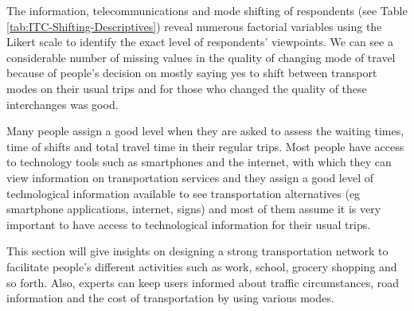\documentclass[
11pt, %
oneside, %
english, %
singlespacing, %
]{macthesis} %
\newcommand{\blandscape}{\begin{landscape}}
\newcommand{\elandscape}{\end{landscape}}
\begin{document}
\newpage
\blandscape
\begin{table}

\caption{\label{tab:unnamed-chunk-11}\label{tab:Social-Interaction-Descriptives}Variables regarding social interactions of respondents}
\centering
{}
\end{table}
\elandscape
\newpage

The information, telecommunications and mode shifting of respondents (see Table \ref{tab:ITC-Shifting-Descriptives}) reveal numerous factorial variables using the Likert scale to identify the exact level of respondents' viewpoints. We can see a considerable number of missing values in the quality of changing mode of travel because of people's decision on mostly saying yes to shift between transport modes on their usual trips and for those who changed the quality of these interchanges was good.

Many people assign a good level when they are asked to assess the waiting times, time of shifts and total travel time in their regular trips. Most people have access to technology tools such as smartphones and the internet, with which they can view information on transportation services and they assign a good level of technological information available to see transportation alternatives (eg smartphone applications, internet, signs) and most of them assume it is very important to have access to technological information for their usual trips.

This section will give insights on designing a strong transportation network to facilitate people's different activities such as work, school, grocery shopping and so forth. Also, experts can keep users informed about traffic circumstances, road information and the cost of transportation by using various modes.
\end{document}
